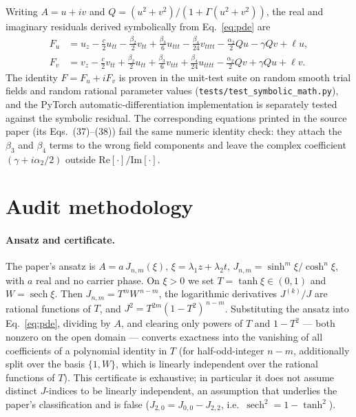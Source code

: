 \documentclass[11pt,a4paper]{article}
\begin{document}
Writing $A=u+iv$ and
$Q=(u^2+v^2)/\!\left(1+\Gamma(u^2+v^2)\right)$, the real and imaginary
residuals derived symbolically from Eq.~\eqref{eq:pde} are
\begin{align}
F_u&=u_z-\tfrac{c}{2}u_{tt}-\tfrac{\beta_2}{2}v_{tt}
+\tfrac{\beta_3}{6}u_{ttt}-\tfrac{\beta_4}{24}v_{tttt}
-\tfrac{\alpha_2}{2}Qu-\gamma Qv+\ell u,\label{eq:Fu}\\
F_v&=v_z-\tfrac{c}{2}v_{tt}+\tfrac{\beta_2}{2}u_{tt}
+\tfrac{\beta_3}{6}v_{ttt}+\tfrac{\beta_4}{24}u_{tttt}
-\tfrac{\alpha_2}{2}Qv+\gamma Qu+\ell v.\label{eq:Fv}
\end{align}
The identity $F=F_u+iF_v$ is proven in the unit-test suite on random smooth
trial fields and random rational parameter values
(\texttt{tests/test\_symbolic\_math.py}), and the PyTorch automatic-differen\-tiation
implementation is separately tested against the symbolic residual.
The corresponding equations printed in the source paper (its Eqs.~(37)--(38))
fail the same numeric identity check: they attach the $\beta_3$ and $\beta_4$
terms to the wrong field components and leave the complex coefficient
$(\gamma+i\alpha_2/2)$ outside $\mathrm{Re}[\cdot]/\mathrm{Im}[\cdot]$.

\section{Audit methodology}
\label{sec:audit}

\paragraph{Ansatz and certificate.}
The paper's ansatz is $A=a\,J_{n,m}(\xi)$, $\xi=\lambda_1z+\lambda_2t$,
$J_{n,m}=\sinh^m\!\xi/\cosh^n\!\xi$, with $a$ real and no carrier phase.
On $\xi>0$ we set $T=\tanh\xi\in(0,1)$ and $W=\operatorname{sech}\xi$. Then
$J_{n,m}=T^mW^{\,n-m}$, the logarithmic derivatives $J^{(k)}/J$ are rational
functions of $T$, and $J^2=T^{2m}(1-T^2)^{\,n-m}$. Substituting the ansatz into
Eq.~\eqref{eq:pde}, dividing by $A$, and clearing only powers of $T$ and
$1-T^2$ --- both nonzero on the open domain --- converts exactness into the
vanishing of all coefficients of a polynomial identity in $T$ (for
half-odd-integer $n-m$, additionally split over the basis $\{1,W\}$, which is
linearly independent over the rational functions of $T$). This certificate is
exhaustive; in particular it does not assume distinct $J$-indices to be
linearly independent, an assumption that underlies the paper's classification
and is false ($J_{2,0}=J_{0,0}-J_{2,2}$, i.e.\
$\operatorname{sech}^2=1-\tanh^2$).
\end{document}
